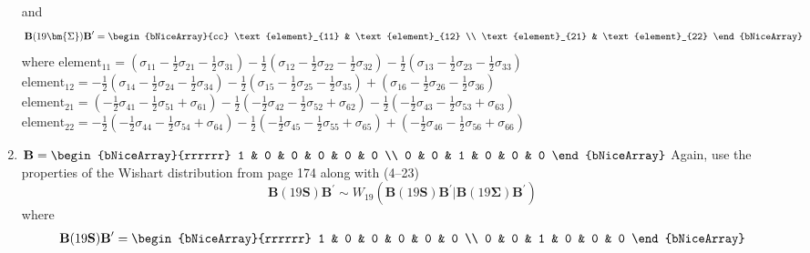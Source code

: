 \begin{enumerate}[label= (\alph*)]
    and
    \[
        \textbf{B}(19\bm{\Sigma})\textbf{B}^{\prime}
        =
        \begin{bNiceArray}{cc}
            \text{element}_{11} & \text{element}_{12} \\
            \text{element}_{21} & \text{element}_{22}
        \end{bNiceArray}
    \]
    where
    \newline
    $\text{element}_{11} = (\sigma_{11} -\frac{1}{2}\sigma_{21} -\frac{1}{2}\sigma_{31})-\frac{1}{2}(\sigma_{12} -\frac{1}{2}\sigma_{22} -\frac{1}{2}\sigma_{32})-\frac{1}{2}(\sigma_{13} -\frac{1}{2}\sigma_{23} -\frac{1}{2}\sigma_{33})$
    \newline
    $\text{element}_{12} = -\frac{1}{2}(\sigma_{14} -\frac{1}{2}\sigma_{24} -\frac{1}{2}\sigma_{34})-\frac{1}{2}(\sigma_{15} -\frac{1}{2}\sigma_{25} -\frac{1}{2}\sigma_{35})+(\sigma_{16} -\frac{1}{2}\sigma_{26} -\frac{1}{2}\sigma_{36})$
    \newline
    $\text{element}_{21} = (-\frac{1}{2}\sigma_{41} -\frac{1}{2}\sigma_{51}+\sigma_{61}) -\frac{1}{2}(-\frac{1}{2}\sigma_{42} -\frac{1}{2}\sigma_{52}+\sigma_{62}) -\frac{1}{2}(-\frac{1}{2}\sigma_{43} -\frac{1}{2}\sigma_{53}+\sigma_{63})$
    \newline
    $\text{element}_{22} = -\frac{1}{2}(-\frac{1}{2}\sigma_{44} -\frac{1}{2}\sigma_{54}+\sigma_{64}) -\frac{1}{2}(-\frac{1}{2}\sigma_{45} -\frac{1}{2}\sigma_{55}+\sigma_{65}) +(-\frac{1}{2}\sigma_{46} -\frac{1}{2}\sigma_{56}+\sigma_{66})$
    \item $\textbf{B}
    =
    \begin{bNiceArray}{rrrrrr}
        1 & 0 & 0 & 0 & 0 & 0 \\
        0 & 0 & 1 & 0 & 0 & 0
    \end{bNiceArray}$
    \newline
    \newline
    Again, use the properties of the Wishart distribution from page 174 along with (4--23)
    \[
        \textbf{B}(19\textbf{S})\textbf{B}^{\prime}
        \sim
        W_{19}\left(\textbf{B}(19\textbf{S})\textbf{B}^{\prime} \big| \textbf{B}(19\bm{\Sigma})\textbf{B}^{\prime}\right)
    \]
    where
    \begin{multline*}
        \textbf{B}(19\textbf{S})\textbf{B}^{\prime}
        =
        \begin{bNiceArray}{rrrrrr}
            1 & 0 & 0 & 0 & 0 & 0 \\
            0 & 0 & 1 & 0 & 0 & 0
        \end{bNiceArray} \\

\end{multline*}
\end{enumerate}
